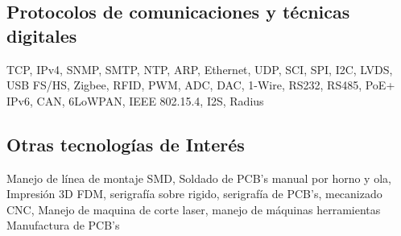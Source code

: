 \documentclass[11pt,a4paper,sans]{moderncv}  %
\begin{document}
   \subsection{Protocolos de comunicaciones y técnicas digitales}
       {TCP, IPv4, SNMP, SMTP, NTP, ARP, Ethernet, UDP, SCI, SPI, I2C, LVDS, USB FS/HS, Zigbee, RFID, PWM, ADC, DAC, 1-Wire, RS232, RS485, PoE+}
     {IPv6, CAN, 6LoWPAN, IEEE 802.15.4, I2S, Radius}
      {}
   
   \subsection{Otras tecnologías de Interés}
       {Manejo de línea de montaje SMD, Soldado de PCB's manual por horno y ola, Impresión 3D FDM, serigrafía sobre rigido, serigrafía de PCB's,  mecanizado CNC, Manejo de maquina de corte laser, manejo de máquinas herramientas}
     {Manufactura de PCB's}
      {}

\end{document}
